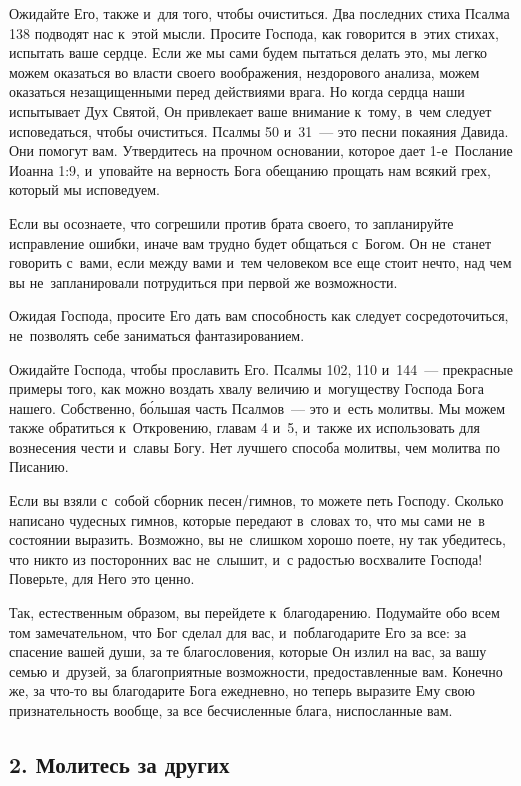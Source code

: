 \documentclass[12pt,article,a4paper,fittopage]{ncc}
\begin{document}
\begin{multicols}{2}
Ожидайте Его, также и~для того, чтобы  очиститься. Два последних стиха Псалма 138 подводят нас к~этой мысли. Просите Господа, как говорится в~этих стихах, испытать ваше сердце. Если же мы сами будем пытаться делать это, мы легко можем оказаться во власти своего воображения, нездорового анализа, можем оказаться незащищенными перед действиями врага. Но когда сердца наши испытывает Дух Святой, Он привлекает ваше внимание к~тому, в~чем следует исповедаться, чтобы очиститься. Псалмы 50 и~31~---  это песни покаяния Давида. Они помогут вам. Утвердитесь на прочном основании, которое дает 1-е~Послание Иоанна 1:9, и~уповайте на верность Бога обещанию прощать нам всякий грех, который мы исповедуем.

Если вы осознаете, что согрешили против брата своего, то запланируйте исправление ошибки, иначе вам трудно будет общаться с~Богом. Он не~станет говорить с~вами, если между вами и~тем человеком все еще стоит нечто, над чем вы не~запланировали потрудиться при первой же возможности.

Ожидая Господа, просите Его дать вам способность как следует сосредоточиться, не~позволять себе заниматься фантазированием.

\pagestyle{lheadings}

Ожидайте Господа, чтобы прославить Его. Псалмы 102, 110 и~144~--- прекрасные примеры того, как можно воздать хвалу величию и~могуществу Господа Бога нашего. Собственно, б\'{о}льшая часть Псалмов~--- это и~есть молитвы. Мы можем также обратиться к~Откровению, главам 4 и~5, и~также их использовать для вознесения чести и~славы Богу. Нет лучшего способа молитвы, чем молитва по Писанию.

Если вы взяли с~собой сборник песен/гимнов, то можете петь Господу. Сколько написано чудесных гимнов, которые передают в~словах то, что мы сами не~в состоянии выразить. Возможно, вы не~слишком хорошо поете, ну так убедитесь, что никто из посторонних вас не~слышит, и~с радостью восхвалите Господа! Поверьте, для Него это ценно.

Так, естественным образом, вы перейдете к~благодарению. Подумайте обо всем том замечательном, что Бог сделал для вас, и~поблагодарите Его за все: за спасение вашей души, за те благословения, которые Он излил на вас, за вашу семью и~друзей, за благоприятные возможности, предоставленные вам. Конечно же, за что-то вы благодарите Бога ежедневно, но теперь выразите Ему свою признательность вообще, за все бесчисленные блага, ниспосланные вам.

\subsection*{2. Молитесь за других}


\end{multicols}
\end{document}
